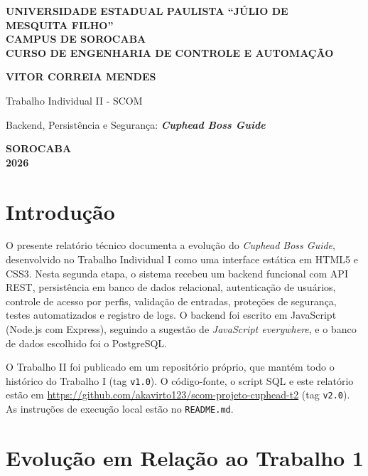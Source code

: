 \documentclass[12pt,a4paper]{article}
\newcommand{\cod}[1]{\texttt{#1}}
\begin{document}
\begin{titlepage}
  \centering
  {\bfseries UNIVERSIDADE ESTADUAL PAULISTA ``JÚLIO DE\\ MESQUITA FILHO''\\
  CAMPUS DE SOROCABA\\[0.8em]
  CURSO DE ENGENHARIA DE CONTROLE E AUTOMAÇÃO\par}
  \vfill
  {\Large\bfseries VITOR CORREIA MENDES\par}
  \vfill
  {\LARGE Trabalho Individual II - SCOM\par}
  {\large Backend, Persistência e Segurança: \textit{\textbf{Cuphead Boss Guide}}\par}
  \vfill\vfill
  {\bfseries SOROCABA\\2026\par}
\end{titlepage}

\tableofcontents
\newpage

\section{Introdução}

O presente relatório técnico documenta a evolução do \textit{Cuphead Boss Guide},
desenvolvido no Trabalho Individual I como uma interface estática em HTML5 e CSS3.
Nesta segunda etapa, o sistema recebeu um backend funcional com API REST,
persistência em banco de dados relacional, autenticação de usuários, controle de
acesso por perfis, validação de entradas, proteções de segurança, testes
automatizados e registro de logs. O backend foi escrito em JavaScript (Node.js com
Express), seguindo a sugestão de \textit{JavaScript everywhere}, e o banco de
dados escolhido foi o PostgreSQL.

O Trabalho II foi publicado em um repositório próprio, que mantém todo o histórico do Trabalho I (tag \cod{v1.0}). O código-fonte, o script SQL e este relatório estão em
\url{https://github.com/akavirto123/scom-projeto-cuphead-t2} (tag \cod{v2.0}). As
instruções de execução local estão no \cod{README.md}.

\section{Evolução em Relação ao Trabalho 1}
\end{document}
